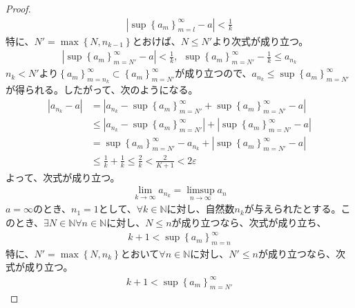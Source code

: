 \documentclass[dvipdfmx]{jsarticle}
\begin{document}
\begin{proof}
\begin{align*}
\left| \sup\left\{ a_{m} \right\}_{m = l}^{\infty} - a \right| < \frac{1}{k}
\end{align*}
特に、$N' = \max\left\{ N,n_{k - 1} \right\}$とおけば、$N \leq N'$より次式が成り立つ。
\begin{align*}
\left| \sup\left\{ a_{m} \right\}_{m = N'}^{\infty} - a \right| < \frac{1}{k},\ \ \sup\left\{ a_{m} \right\}_{m = N'}^{\infty} - \frac{1}{k} \leq a_{n_{k}}
\end{align*}
$n_{k} < N'$より$\left\{ a_{m} \right\}_{m = n_{k}}^{\infty} \subset \left\{ a_{m} \right\}_{m = N'}^{\infty}$が成り立つので、$a_{n_{k}} \leq \sup\left\{ a_{m} \right\}_{m = N'}^{\infty}$が得られる。したがって、次のようになる。
\begin{align*}
\left| a_{n_{k}} - a \right| &= \left| a_{n_{k}} - \sup\left\{ a_{m} \right\}_{m = N'}^{\infty} + \sup\left\{ a_{m} \right\}_{m = N'}^{\infty} - a \right|\\
&\leq \left| a_{n_{k}} - \sup\left\{ a_{m} \right\}_{m = N'}^{\infty} \right| + \left| \sup\left\{ a_{m} \right\}_{m = N'}^{\infty} - a \right|\\
&= \sup\left\{ a_{m} \right\}_{m = N'}^{\infty} - a_{n_{k}} + \left| \sup\left\{ a_{m} \right\}_{m = N'}^{\infty} - a \right|\\
&\leq \frac{1}{k} + \frac{1}{k} \leq \frac{2}{k} < \frac{2}{K + 1} < 2\varepsilon
\end{align*}
よって、次式が成り立つ。
\begin{align*}
\lim_{k \rightarrow \infty}a_{n_{k}} = \limsup_{n \rightarrow \infty}a_{n}
\end{align*}
$a = \infty$のとき、$n_{1} = 1$として、$\forall k \in \mathbb{N}$に対し、自然数$n_{k}$が与えられたとする。このとき、$\exists N \in \mathbb{N}\forall n \in \mathbb{N}$に対し、$N \leq n$が成り立つなら、次式が成り立ち、
\begin{align*}
k + 1 < \sup\left\{ a_{m} \right\}_{m = n}^{\infty}
\end{align*}
特に、$N' = \max\left\{ N,n_{k} \right\}$とおいて$\forall n \in \mathbb{N}$に対し、$N' \leq n$が成り立つなら、次式が成り立つ。
\begin{align*}
k + 1 < \sup\left\{ a_{m} \right\}_{m = N'}^{\infty}
\end{align*}

\end{proof}
\end{document}

